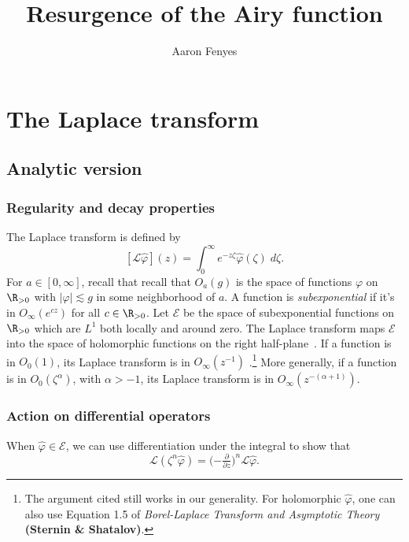 \documentclass{article}
\title{Resurgence of the Airy function}
\author{Aaron Fenyes}
\theoremstyle{definition}
\theoremstyle{plain}
\newcommand{\posreal}{\R_{> 0}}
\newcommand{\laplace}{\mathcal{L}}
\begin{document}
\maketitle
\section{The Laplace transform}
\subsection{Analytic version}
\subsubsection{Regularity and decay properties}
The Laplace transform is defined by
\[ [\mathcal{L}\hat{\varphi}](z) = \int_0^\infty e^{-z \zeta} \hat{\varphi}(\zeta)\;d\zeta. \]
For $a \in [0, \infty]$, recall that recall that $O_a(g)$ is the space of functions $\varphi$ on $\posreal$ with $|\varphi| \lesssim g$ in some neighborhood of $a$. A function is {\em subexponential} if it's in $O_\infty(e^{cz})$ for all $c \in \posreal$. Let $\mathcal{E}$ be the space of subexponential functions on $\posreal$ which are $L^1$ both locally and around zero. The Laplace transform maps $\mathcal{E}$ into the space of holomorphic functions on the right half-plane~\cite[\S 5.6]{diverg-resurg-i}. If a function is in $O_0(1)$, its Laplace transform is in $O_\infty(z^{-1})$ \cite[equation~1.8]{laplace-tfm}.\footnote{The argument cited still works in our generality. For holomorphic $\hat{\varphi}$, one can also use Equation 1.5 of {\em Borel-Laplace Transform and Asymptotic Theory} \textbf{(Sternin \& Shatalov)}.} More generally, if a function is in $O_0(\zeta^\alpha)$, with $\alpha > -1$, its Laplace transform is in $O_\infty(z^{-(\alpha + 1)})$.
\subsubsection{Action on differential operators}\label{L-diff-op}
When $\hat{\varphi} \in \mathcal{E}$, we can use differentiation under the integral to show that~\cite[Theorem~1.34]{laplace-tfm}
\begin{equation}\label{id:L-mult}
\laplace (\zeta^n \hat{\varphi}) = \big({-\tfrac{\partial}{\partial z}}\big)^n \laplace \hat{\varphi}.
\end{equation}
\end{document}

